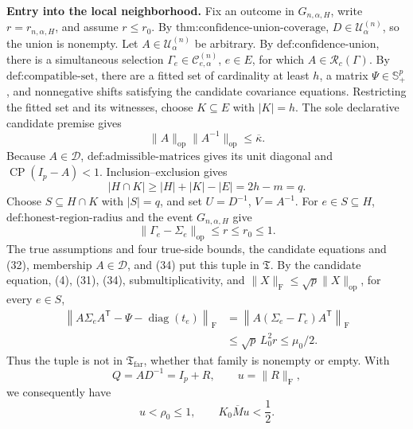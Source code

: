 \textbf{Entry into the local neighborhood.}
Fix an outcome in \(G_{n,\alpha,H}\), write \(r=r_{n,\alpha,H}\), and assume \(r\leq r_0\). By \(\text{thm:confidence-union-coverage}\), \(D\in\mathcal U^{(n)}_\alpha\), so the union is nonempty. Let \(A\in\mathcal U^{(n)}_\alpha\) be arbitrary. By \(\text{def:confidence-union}\), there is a simultaneous selection \(\Gamma_e\in\mathcal C^{(n)}_{e,\alpha}\), \(e\in E\), for which \(A\in\mathcal R_c(\Gamma)\). By \(\text{def:compatible-set}\), there are a fitted set of cardinality at least \(h\), a matrix \(\Psi\in\mathbb S_+^p\), and nonnegative shifts satisfying the candidate covariance equations. Restricting the fitted set and its witnesses, choose \(K\subseteq E\) with \(|K|=h\). The sole declarative candidate premise gives
\[
\|A\|_{\mathrm{op}}\|A^{-1}\|_{\mathrm{op}}
\leq\overline\kappa.
\tag{32}
\]
Because \(A\in\mathcal D\), \(\text{def:admissible-matrices}\) gives its unit diagonal and \(\operatorname{CP}(I_p-A)<1\). Inclusion--exclusion gives
\[
|H\cap K|
\geq|H|+|K|-|E|
=2h-m=q.
\tag{33}
\]
Choose \(S\subseteq H\cap K\) with \(|S|=q\), and set \(U=D^{-1}\), \(V=A^{-1}\). For \(e\in S\subseteq H\), \(\text{def:honest-region-radius}\) and the event \(G_{n,\alpha,H}\) give
\[
\|\Gamma_e-\Sigma_e\|_{\mathrm{op}}
\leq r\leq r_0\leq1.
\tag{34}
\]
The true assumptions and four true-side bounds, the candidate equations and (32), membership \(A\in\mathcal D\), and (34) put this tuple in \(\mathfrak T\). By the candidate equation, (4), (31), (34), submultiplicativity, and \(\|X\|_{\mathrm F}\leq\sqrt p\|X\|_{\mathrm{op}}\), for every \(e\in S\),
\[
\begin{aligned}
\left\|A\Sigma_eA^{\mathsf T}
-\Psi-\operatorname{diag}(t_e)\right\|_{\mathrm F}
&=\left\|A(\Sigma_e-\Gamma_e)A^{\mathsf T}\right\|_{\mathrm F}\\
&\leq\sqrt p\,L_0^2r
\leq\mu_0/2.
\end{aligned}
\tag{35}
\]
Thus the tuple is not in \(\mathfrak T_{\mathrm{far}}\), whether that family is nonempty or empty. With
\[
Q=AD^{-1}=I_p+R,
\qquad
u=\|R\|_{\mathrm F},
\]
we consequently have
\[
u<\rho_0\leq1,
\qquad
K_0\overline M u<\frac12.
\tag{36}
\]

